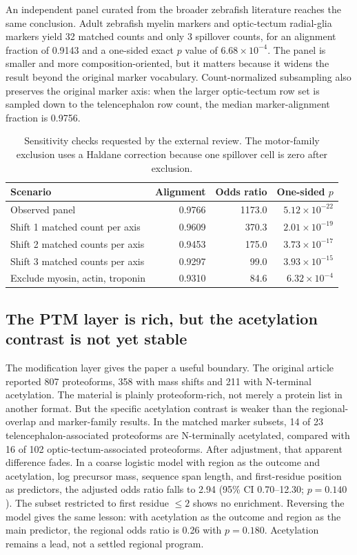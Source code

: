 An independent panel curated from the broader zebrafish literature reaches the same conclusion. Adult zebrafish myelin markers and optic-tectum radial-glia markers yield 32 matched counts and only 3 spillover counts, for an alignment fraction of 0.9143 and a one-sided exact $p$ value of $6.68 \times 10^{-4}$. The panel is smaller and more composition-oriented, but it matters because it widens the result beyond the original marker vocabulary. Count-normalized subsampling also preserves the original marker axis: when the larger optic-tectum row set is sampled down to the telencephalon row count, the median marker-alignment fraction is 0.9756.

\begin{table}[t]
\centering
\caption{Sensitivity checks requested by the external review. The motor-family exclusion uses a Haldane correction because one spillover cell is zero after exclusion.}
\label{tab:sensitivity}
\begin{tabular}{lrrr}
\toprule
Scenario & Alignment & Odds ratio & One-sided $p$ \\
\midrule
Observed panel & 0.9766 & 1173.0 & $5.12 \times 10^{-22}$ \\
Shift 1 matched count per axis & 0.9609 & 370.3 & $2.01 \times 10^{-19}$ \\
Shift 2 matched counts per axis & 0.9453 & 175.0 & $3.73 \times 10^{-17}$ \\
Shift 3 matched counts per axis & 0.9297 & 99.0 & $3.93 \times 10^{-15}$ \\
Exclude myosin, actin, troponin & 0.9310 & 84.6 & $6.32 \times 10^{-4}$ \\
\bottomrule
\end{tabular}
\end{table}

\subsection{The PTM layer is rich, but the acetylation contrast is not yet stable}

The modification layer gives the paper a useful boundary. The original article reported 807 proteoforms, 358 with mass shifts and 211 with N-terminal acetylation. The material is plainly proteoform-rich, not merely a protein list in another format. But the specific acetylation contrast is weaker than the regional-overlap and marker-family results. In the matched marker subsets, 14 of 23 telencephalon-associated proteoforms are N-terminally acetylated, compared with 16 of 102 optic-tectum-associated proteoforms. After adjustment, that apparent difference fades. In a coarse logistic model with region as the outcome and acetylation, log precursor mass, sequence span length, and first-residue position as predictors, the adjusted odds ratio falls to 2.94 (95\% CI 0.70--12.30; $p = 0.140$). The subset restricted to first residue $\leq 2$ shows no enrichment. Reversing the model gives the same lesson: with acetylation as the outcome and region as the main predictor, the regional odds ratio is 0.26 with $p = 0.180$. Acetylation remains a lead, not a settled regional program.

